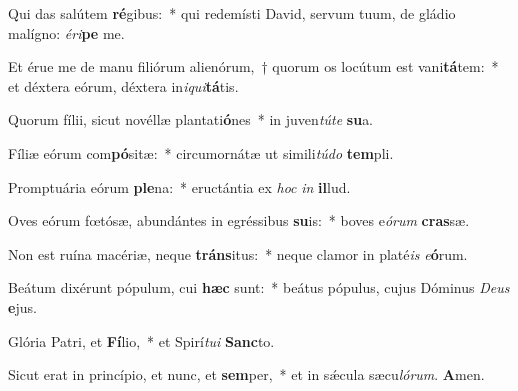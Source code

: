 ﻿\item Qui das salútem \textbf{ré}gibus:~* qui redemísti David, servum tuum, de gládio malígno: \textit{é}\textit{ri}\textbf{pe} me.

\item Et érue me de manu filiórum alienórum,~† quorum os locútum est vani\textbf{tá}tem:~* et déxtera eórum, déxtera in\textit{i}\textit{qui}\textbf{tá}tis.

\item Quorum fílii, sicut novéllæ plantati\textbf{ó}nes~* in juven\textit{tú}\textit{te} \textbf{su}a.

\item Fíliæ eórum com\textbf{pó}sitæ:~* circumornátæ ut simili\textit{tú}\textit{do} \textbf{tem}pli.

\item Promptuária eórum \textbf{ple}na:~* eructántia ex \textit{hoc} \textit{in} \textbf{il}lud.

\item Oves eórum fœtósæ, abundántes in egréssibus \textbf{su}is:~* boves e\textit{ó}\textit{rum} \textbf{cras}sæ.

\item Non est ruína macériæ, neque \textbf{tráns}itus:~* neque clamor in platé\textit{is} \textit{e}\textbf{ó}rum.

\item Beátum dixérunt pópulum, cui \textbf{hæc} sunt:~* beátus pópulus, cujus Dóminus \textit{De}\textit{us} \textbf{e}jus.

\item Glória Patri, et \textbf{Fí}lio,~* et Spirí\textit{tu}\textit{i} \textbf{Sanc}to.

\item Sicut erat in princípio, et nunc, et \textbf{sem}per,~* et in sǽcula sæcu\textit{ló}\textit{rum}. \textbf{A}men.